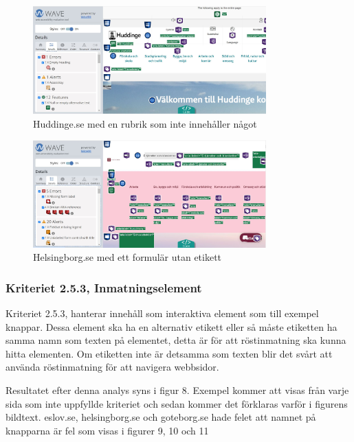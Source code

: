 \documentclass[11p]{article}
\begin{document}
    \begin{figure}[hbt!]
        \includegraphics[width=0.8\textwidth]{../images/Huddinge246.jpg}
        \caption{ Huddinge.se med en rubrik som inte innehåller något }
    \end{figure}

    \begin{figure}[hbt!]
        \includegraphics[width=0.8\textwidth]{../images/Helsingborg246.jpg}
        \caption{ Helsingborg.se med ett formulär utan etikett }
    \end{figure}

    \subsubsection{Kriteriet 2.5.3, Inmatningselement}
    Kriteriet 2.5.3, hanterar innehåll som interaktiva element som till exempel knappar.
    Dessa element ska ha en alternativ etikett eller så måste etiketten ha samma namn som texten på elementet, detta är för att röstinmatning ska kunna hitta elementen.
    Om etiketten inte är detsamma som texten blir det svårt att använda röstinmatning för att navigera webbsidor.

    Resultatet efter denna analys syns i figur 8.
    Exempel kommer att visas från varje sida som inte uppfyllde kriteriet och sedan kommer det förklaras varför i figurens bildtext.
    eslov.se, helsingborg.se och goteborg.se hade felet att namnet på knapparna är fel som visas i figurer 9, 10 och 11
\end{document}
